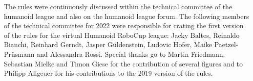 The rules were continuously discussed within the technical committee of the
humanoid league and also on the humanoid league forum.
The following members of the technical committee for 2022 were responsible for
crating the first version of the rules for the virtual Humanoid RoboCup league: Jacky Baltes, Reinaldo Bianchi, Reinhard Gerndt, Jasper G\"{u}ldenstein,
Ludovic Hofer, Maike Paetzel-Pr\"{u}smann and Alessandra Rossi.
Special thanks go to Martin Friedmann, Sebastian Mielke and Timon Giese for the
contribution of several figures and to Philipp Allgeuer for his contributions to
the 2019 version of the rules.
